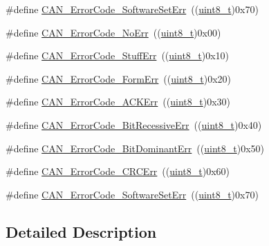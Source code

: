\begin{DoxyCompactItemize}
\item 
\#define \hyperlink{group___c_a_n___error___code__constants_ga927089dd74347b9fea7a7c59f3840a7c}{C\+A\+N\+\_\+\+Error\+Code\+\_\+\+Software\+Set\+Err}~((\hyperlink{_p_e___types_8h_aba7bc1797add20fe3efdf37ced1182c5}{uint8\+\_\+t})0x70)
\item 
\#define \hyperlink{group___c_a_n___error___code__constants_ga025d891e9c5cec2cfecb2213b4f74a9e}{C\+A\+N\+\_\+\+Error\+Code\+\_\+\+No\+Err}~((\hyperlink{_p_e___types_8h_aba7bc1797add20fe3efdf37ced1182c5}{uint8\+\_\+t})0x00)
\item 
\#define \hyperlink{group___c_a_n___error___code__constants_gaa733d1c078472912c3bf60fbdc53734d}{C\+A\+N\+\_\+\+Error\+Code\+\_\+\+Stuff\+Err}~((\hyperlink{_p_e___types_8h_aba7bc1797add20fe3efdf37ced1182c5}{uint8\+\_\+t})0x10)
\item 
\#define \hyperlink{group___c_a_n___error___code__constants_ga1fe585558bb8d5c834b4266661392cb2}{C\+A\+N\+\_\+\+Error\+Code\+\_\+\+Form\+Err}~((\hyperlink{_p_e___types_8h_aba7bc1797add20fe3efdf37ced1182c5}{uint8\+\_\+t})0x20)
\item 
\#define \hyperlink{group___c_a_n___error___code__constants_gad47e6af0116d1b6de85e29286c0b8607}{C\+A\+N\+\_\+\+Error\+Code\+\_\+\+A\+C\+K\+Err}~((\hyperlink{_p_e___types_8h_aba7bc1797add20fe3efdf37ced1182c5}{uint8\+\_\+t})0x30)
\item 
\#define \hyperlink{group___c_a_n___error___code__constants_gaf800de7683f1d22194e1df8eb3b1c5bb}{C\+A\+N\+\_\+\+Error\+Code\+\_\+\+Bit\+Recessive\+Err}~((\hyperlink{_p_e___types_8h_aba7bc1797add20fe3efdf37ced1182c5}{uint8\+\_\+t})0x40)
\item 
\#define \hyperlink{group___c_a_n___error___code__constants_gaa19708aa85d1a34f8f7f25a2bfe88b19}{C\+A\+N\+\_\+\+Error\+Code\+\_\+\+Bit\+Dominant\+Err}~((\hyperlink{_p_e___types_8h_aba7bc1797add20fe3efdf37ced1182c5}{uint8\+\_\+t})0x50)
\item 
\#define \hyperlink{group___c_a_n___error___code__constants_gafa75157442dba7ba1a91036242b78e92}{C\+A\+N\+\_\+\+Error\+Code\+\_\+\+C\+R\+C\+Err}~((\hyperlink{_p_e___types_8h_aba7bc1797add20fe3efdf37ced1182c5}{uint8\+\_\+t})0x60)
\item 
\#define \hyperlink{group___c_a_n___error___code__constants_ga927089dd74347b9fea7a7c59f3840a7c}{C\+A\+N\+\_\+\+Error\+Code\+\_\+\+Software\+Set\+Err}~((\hyperlink{_p_e___types_8h_aba7bc1797add20fe3efdf37ced1182c5}{uint8\+\_\+t})0x70)
\end{DoxyCompactItemize}


\subsection{Detailed Description}


